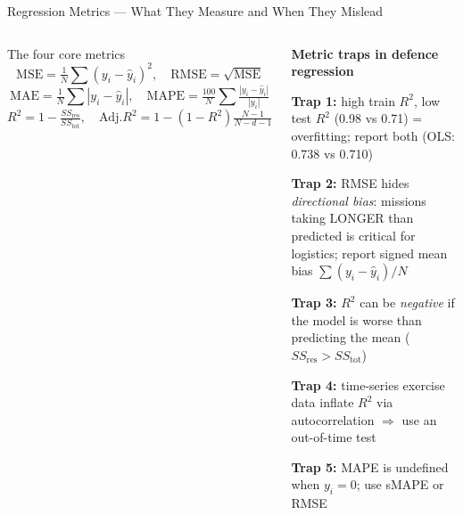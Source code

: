 \documentclass[aspectratio=169,10pt,t]{beamer}
\begin{document}
\begin{frame}{Regression Metrics --- What They Measure and When They Mislead}
\begin{columns}[T]
\begin{fbx}{The four core metrics}\[\text{MSE}=\tfrac1N\sum(y_i-\hat y_i)^{2},\quad\text{RMSE}=\sqrt{\text{MSE}}\]\[\text{MAE}=\tfrac1N\sum|y_i-\hat y_i|,\quad\text{MAPE}=\tfrac{100}{N}\sum\tfrac{|y_i-\hat y_i|}{|y_i|}\]\[R^{2}=1-\tfrac{SS_{\text{res}}}{SS_{\text{tot}}},\quad \text{Adj.}R^{2}=1-(1-R^{2})\tfrac{N-1}{N-d-1}\]\end{fbx}
\begin{wbox}\scriptsize\textbf{Metric traps in defence regression}\begin{tl}\item \textbf{Trap 1:} high train $R^2$, low test $R^2$ (0.98 vs 0.71) = overfitting; report both (OLS: 0.738 vs 0.710)\item \textbf{Trap 2:} RMSE hides \emph{directional bias}: missions taking LONGER than predicted is critical for logistics; report signed mean bias $\sum(y_i-\hat y_i)/N$\item \textbf{Trap 3:} $R^2$ can be \emph{negative} if the model is worse than predicting the mean ($SS_{\text{res}}>SS_{\text{tot}}$)\item \textbf{Trap 4:} time-series exercise data inflate $R^2$ via autocorrelation $\Rightarrow$ use an out-of-time test\item \textbf{Trap 5:} MAPE is undefined when $y_i=0$; use sMAPE or RMSE\end{tl}\end{wbox}
\end{columns}
\end{frame}
\end{document}
